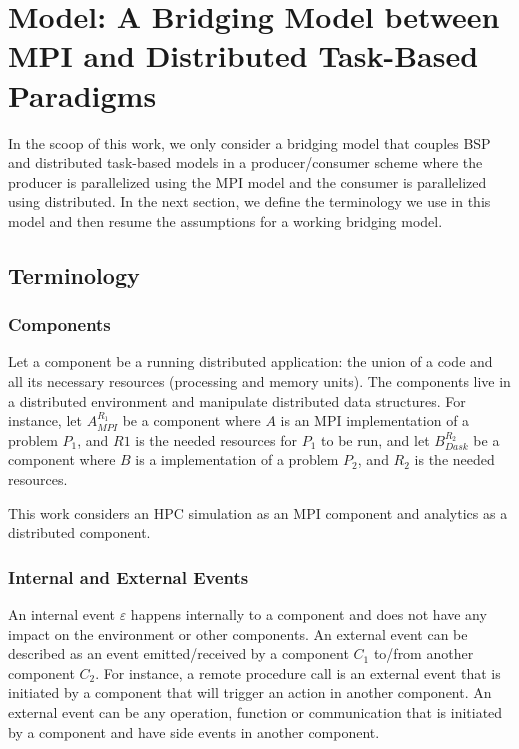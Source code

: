 \section{\deisa Model: A Bridging Model between MPI and \dask Distributed Task-Based Paradigms}\label{sec:bsp2dtb}
In the scoop of this work, we only consider a bridging model that couples BSP and distributed task-based models in a producer/consumer scheme where the producer is parallelized using the MPI model and the consumer is parallelized using \dask distributed. In the next section, we define the terminology we use in this model and then resume the assumptions for a working bridging model. 

\subsection{Terminology}

\subsubsection{\deisa Components}\label{sec:btp:actor}
Let a component be a running distributed application: the union of a code and all its necessary resources (processing and memory units). The components live in a distributed environment and manipulate distributed data structures.  
For instance, let $A_{MPI}^{R_{1}}$ be a component where $A$ is an MPI implementation of a problem $P_{1}$, and $R1$ is the needed resources for $P_{1}$ to be run, and let $B_{Dask}^{R_{2}}$ be a component where $B$ is a \dask implementation of a problem $P_{2}$, and $R_{2}$ is the needed resources.

This work considers an HPC simulation as an MPI component and analytics as a \dask distributed component. 

\subsubsection{Internal and External Events}
An internal event $\varepsilon$ happens internally to a component and does not have any impact on the environment or other components.  
An external event can be described as an event emitted/received by a component $C_1$ to/from another component $C_2$. For instance, a remote procedure call is an external event that is initiated by a component that will trigger an action in another component. An external event can be any operation, function or communication that is initiated by a component and have side events in another component.  

